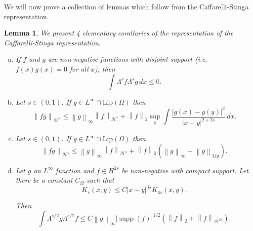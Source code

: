 \documentclass[11pt]{amsart}
\newtheorem{lemma}[theorem]{Lemma}
\theoremstyle{remark}
\theoremstyle{definition}
\newcommand{\norm}[1]{\left\lVert#1\right\rVert}
\newcommand{\paren}[1]{\left( #1 \right)}
\DeclareMathOperator{\supp}{supp}
\newcommand{\Lip}{\text{Lip}}
\newcommand{\HD}{\mathcal{H}}
\newcommand{\Comega}{C_\Omega}
\begin{document}
We will now prove a collection of lemmas which follow from the Caffarelli-Stinga representation.  

\begin{lemma} \label{thm:Lambda stuff}
We present 4 elementary corallaries of the representation of the Caffarelli-Stinga representation.  

\begin{enumerate}[(a)]
\item \label{thm:disjoint} If $f$ and $g$ are non-negative functions with disjoint support (i.e. $f(x)g(x) = 0$ for all $x$), then 
\[ \int \Lambda^s f \Lambda^s g \,dx \leq 0. \]

\item \label{thm:product rule} Let $s \in (0,1)$.  If $g \in L^\infty \cap \Lip(\Omega)$ then
\[ \norm{fg}_{\HD^s} \leq \norm{g}_\infty \norm{f}_{\HD^s} + \norm{f}_2 \sup_y \int \frac{|g(x)-g(y)|^2}{|x-y|^{2+2s}} \,dx. \]

\item \label{thm:extra product rule} Let $s \in (0,1)$.  If $g \in L^\infty \cap \Lip(\Omega)$ then
\[  \norm{fg}_{\HD^s} \leq \norm{g}_\infty \norm{f}_{\HD^s} + \norm{f}_2 \paren{\norm{g}_\infty + \norm{g}_\Lip}. \]

\item \label{thm:L1 of Lambda bounded} Let $g$ an $L^\infty$ function and $f \in H^{2s}$ be non-negative with compact support.  Let there be a constant $\Comega$ such that
\begin{equation} \label{K bounded between orders} K_s(x,y) \leq C |x-y|^{3s} K_{4s}(x,y). \end{equation}

Then
\[ \int \Lambda^{s/2} g \Lambda^{s/2} f \leq C \norm{g}_\infty |\supp(f)|^{1/2} \paren{ \norm{f}_2 + \norm{f}_{\HD^{2s}}}. \]

\end{enumerate}
\end{lemma}
\end{document}

